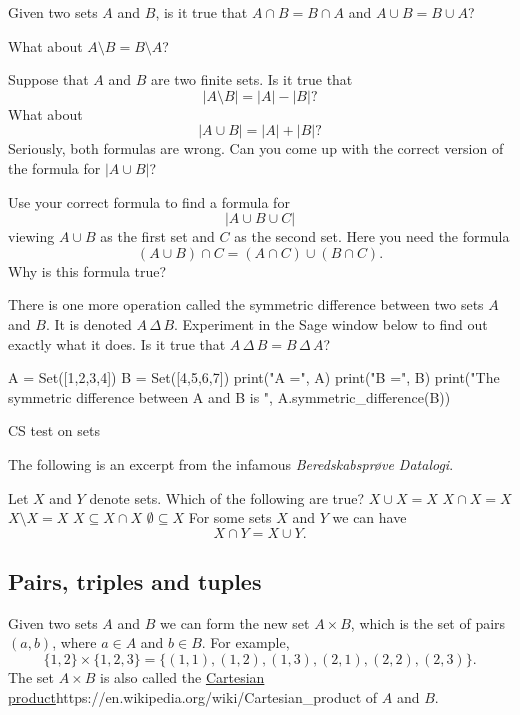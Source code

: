 \documentclass{article}
\begin{document}
\beginshex
Given two sets $A$ and $B$, is it true that
$A \cap B = B \cap A$ and $A\cup B = B\cup A$?

What about $A\setminus B = B\setminus A$?

Suppose that $A$ and $B$ are two finite sets. Is it true that
$$
|A\setminus B| = |A| - |B|?
$$
What about
$$
|A\cup B| = |A| + |B|?
$$
Seriously, both formulas are wrong. Can you come up with the correct
version of the formula for $|A \cup B|$?

Use your correct formula to find a formula for
$$
|A\cup B \cup C|
$$
viewing $A\cup B$ as the first set and $C$ as the second set. Here you need
the formula
$$
(A\cup B)\cap C = (A\cap C) \cup (B\cap C).
$$
Why is this formula true?
\endshex

\beginshex
There is one more operation called the symmetric difference between two sets $A$ and $B$. It is
denoted $A\, \Delta\, B$. Experiment in the Sage window below to find out exactly what it does.
Is it true that $A\, \Delta\, B = B\, \Delta\, A$?

\begin{sage}
A = Set([1,2,3,4])
B = Set([4,5,6,7])
print("A =", A)
print("B =", B)
print("The symmetric difference between A and B is ", A.symmetric_difference(B))
\end{sage}
\endshex

\begin{hideinbutton}{CS test on sets}

The following is an excerpt from the infamous \emph{Beredskabsprøve Datalogi}.

\begin{quiz}
\question
Let $X$ and $Y$ denote sets. Which of the following are true?
$X \cup X = X$
$X\cap X = X$
$X\setminus X = X$
$X\subseteq X\cap X$
$\emptyset \subseteq X$
For some sets $X$ and $Y$ we can have
$$
X\cap Y = X\cup Y.
$$
\end{quiz}
\end{hideinbutton}

\subsection{Pairs, triples and tuples}

Given two sets $A$ and $B$ we can form the new set $A\times B$,
which is the set of pairs $(a, b)$, where $a\in A$ and
$b\in B$. For example,
$$
\{1, 2\}\times \{1, 2, 3\} = 
\{(1, 1), (1, 2), (1, 3), (2, 1), (2, 2), (2, 3)\}.
$$
The set $A\times B$ is also called the \url{Cartesian
  product}{https://en.wikipedia.org/wiki/Cartesian_product} of $A$ and
$B$.
\end{document}
